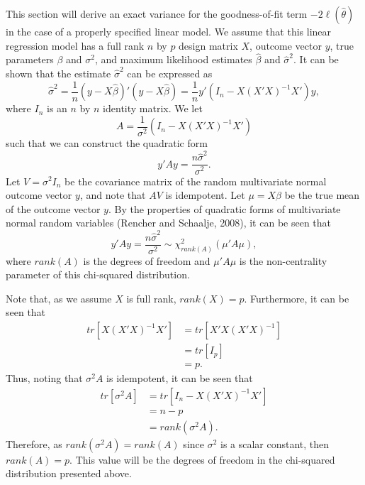This section will derive an exact variance for the goodness-of-fit term $-2 \ell (\hat{\theta} )$ in the case of a properly specified
linear model. We assume that this linear regression model has a full rank $n$ by $p$ design matrix $X$, outcome vector $y$, true parameters $\beta$ and $\sigma^2$,
and maximum likelihood estimates $\hat{\beta}$ and $\hat{\sigma}^2$. It can be shown that the estimate $\hat{\sigma}^2$ can be expressed as
\begin{equation*}
	\hat{\sigma}^2 =  \frac{1}{n} (y-X\hat{\beta})'(y-X\hat{\beta}) = \frac{1}{n} y'(I_n - X(X'X)^{-1}X')y ,
\end{equation*}
where $I_n$ is an $n$ by $n$ identity matrix. We let
\begin{equation*}
	A = \frac{1}{\sigma^2} (I_n - X(X'X)^{-1}X') 
\end{equation*}
such that we can construct the quadratic form
\begin{equation*}
	y'Ay = \frac{n \hat{\sigma}^2}{\sigma^2} .
\end{equation*}
Let $V = \sigma^2 I_n$ be the covariance matrix of the random multivariate normal outcome vector $y$, and note that $AV$ is idempotent. Let $\mu = X \beta$ be the
true mean of the outcome vector $y$. By the properties of quadratic forms of multivariate normal random variables (Rencher and Schaalje, 2008), it can be seen that
\begin{equation*}
	y'Ay = \frac{n \hat{\sigma}^2}{\sigma^2} \sim \chi^2_{rank \left( A \right) } (\mu 'A\mu) ,
\end{equation*}
where $rank \left( A \right)$ is the degrees of freedom and $\mu 'A \mu$ is the non-centrality parameter of this chi-squared distribution.

Note that, as we assume $X$ is full rank, $rank(X) = p$. Furthermore, it can be seen that
\begin{equation*}
	\begin{split}
	tr\left[ X(X'X)^{-1}X' \right] & = tr \left[ X'X(X'X)^{-1} \right]  \\ 
	& = tr \left[ I_p \right] \\
	& = p .
	\end{split}
\end{equation*}
Thus, noting that $\sigma^2 A$ is idempotent, it can be seen that
\begin{equation*}
	\begin{split}
	tr \left[ \sigma^2 A \right] & = tr \left[ I_n - X(X'X)^{-1}X' \right]  \\ 
	& = n-p \\
	& = rank \left( \sigma^2 A \right) .
	\end{split}
\end{equation*}
Therefore, as $rank \left( \sigma^2 A \right) = rank \left( A \right)$ since $\sigma^2$ is a scalar constant, then $rank \left( A \right) = p$. This value will be the degrees of
freedom in the chi-squared distribution presented above.

